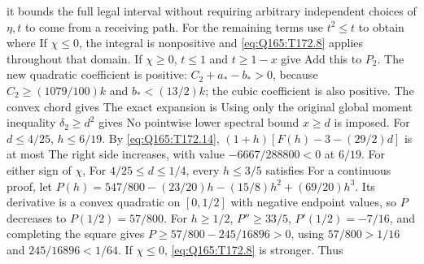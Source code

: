 it bounds the full legal interval without requiring arbitrary independent
choices of $\eta,\allowbreak t$ to come from a receiving path.
For the remaining terms use $t^2\le\allowbreak  t$ to obtain
where
If $\chi\le\allowbreak 0$, the integral is nonpositive and
\eqref{eq:Q165:T172.8} applies throughout that domain.
If $\chi\ge\allowbreak 0$, $t\le\allowbreak 1$ and $t\ge\allowbreak 1-x$ give
Add this to $P_2$. The new quadratic coefficient is positive:
$C_2+a_*-b_*>\allowbreak 0$, because $C_2\ge\allowbreak (1079/100)k$ and $b_*<\allowbreak (13/2)k$;
the cubic coefficient is also positive. The convex chord gives
The exact expansion is
Using only the original global moment inequality $\delta_2\ge\allowbreak  d^2$ gives
No pointwise lower spectral bound $x\ge\allowbreak  d$ is imposed.
For $d\le\allowbreak 4/25$, $h\le\allowbreak 6/19$. By \eqref{eq:Q165:T172.14},
$(1+h)[F(h)-3-(29/2)d]$ is at most
The right side increases, with value $-6667/288800<\allowbreak 0$ at $6/19$.
For either sign of $\chi$,
For $4/25\le\allowbreak  d\le\allowbreak 1/4$, every $h\le\allowbreak 3/5$ satisfies
For a continuous proof, let
$P(h)=\allowbreak 547/800-(23/20)h-(15/8)h^2+(69/20)h^3$.
Its derivative is a convex quadratic on $[0,\allowbreak 1/2]$ with negative endpoint
values, so $P$ decreases to $P(1/2)=\allowbreak 57/800$.
For $h\ge\allowbreak 1/2$, $P''\ge\allowbreak 33/5$, $P'(1/2)=\allowbreak -7/16$, and completing the
square gives $P\ge\allowbreak 57/800-245/16896>\allowbreak 0$, using
$57/800>\allowbreak 1/16$ and $245/16896<\allowbreak 1/64$.
If $\chi\le\allowbreak 0$, \eqref{eq:Q165:T172.8} is stronger. Thus

